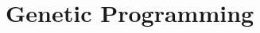 \documentclass[12pt]{article}
\begin{document}



\section{Genetic Programming} \label{Genetic Programming}
\end{document}
